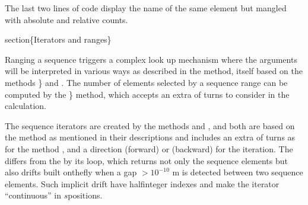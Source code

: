 \documentclass[letterpaper,10pt,english]{sphinxmanual}
\begin{document}
\begin{sphinxVerbatim}[commandchars=\\\{\}]
       
    
\end{sphinxVerbatim}

\sphinxAtStartPar
The last two lines of code display the name of the same element but mangled with absolute and relative counts.

\sphinxAtStartPar
section\{Iterators and ranges\}

\sphinxAtStartPar
Ranging a sequence triggers a complex look up mechanism where the arguments will be interpreted in various ways as described in the  method,
itself based on the methods \} and . The number of elements selected by a sequence range can be computed by the \} method,
which accepts an extra  of turns to consider in the calculation.

\sphinxAtStartPar
The sequence iterators are created by the methods  and , and both are based on the  method as mentioned in their descriptions
and includes an extra  of turns as for the method , and a direction  (forward) or  (backward) for the iteration.
The  differs from the  by its loop, which returns not only the sequence elements but also  drifts built on\sphinxhyphen{}the\sphinxhyphen{}fly when a gap
\(>10^{-10}\) m is detected between two sequence elements. Such implicit drift have half\sphinxhyphen{}integer indexes and make the iterator “continuous” in \(s\)\sphinxhyphen{}positions.
\end{document}
